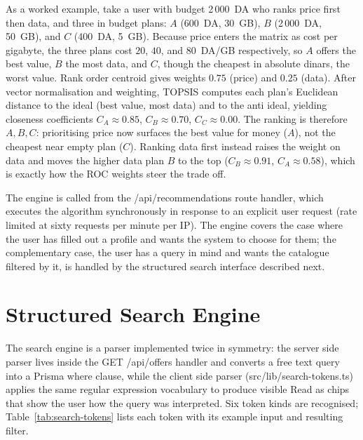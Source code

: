 As a worked example, take a user with budget 2\,000~DA who ranks price first then data, and three in budget plans: $A$ (600~DA, 30~GB), $B$ (2\,000~DA, 50~GB), and $C$ (400~DA, 5~GB). Because price enters the matrix as cost per gigabyte, the three plans cost $20$, $40$, and $80$~DA/GB respectively, so $A$ offers the best value, $B$ the most data, and $C$, though the cheapest in absolute dinars, the worst value. Rank order centroid gives weights $0.75$ (price) and $0.25$ (data). After vector normalisation and weighting, TOPSIS computes each plan's Euclidean distance to the ideal (best value, most data) and to the anti ideal, yielding closeness coefficients $C_A \approx 0.85$, $C_B \approx 0.70$, $C_C \approx 0.00$. The ranking is therefore $A, B, C$: prioritising price now surfaces the best value for money ($A$), not the cheapest near empty plan ($C$). Ranking data first instead raises the weight on data and moves the higher data plan $B$ to the top ($C_B \approx 0.91$, $C_A \approx 0.58$), which is exactly how the ROC weights steer the trade off.

The engine is called from the /api/recommendations route handler, which executes the algorithm synchronously in response to an explicit user request (rate limited at sixty requests per minute per IP). The engine covers the case where the user has filled out a profile and wants the system to choose for them; the complementary case, the user has a query in mind and wants the catalogue filtered by it, is handled by the structured search interface described next.

\section{Structured Search Engine}

The search engine is a parser implemented twice in symmetry: the server side parser lives inside the GET /api/offers handler and converts a free text query into a Prisma where clause, while the client side parser (src/lib/search-tokens.ts) applies the same regular expression vocabulary to produce visible \guillemotleft{}Read as\guillemotright{} chips that show the user how the query was interpreted. Six token kinds are recognised; Table~\ref{tab:search-tokens} lists each token with its example input and resulting filter.

